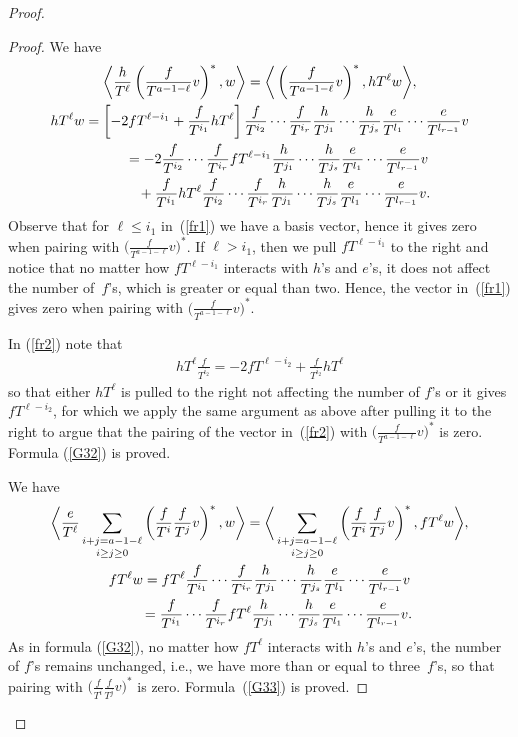 \documentclass[pdftex]{sigma}
\numberwithin{equation}{section}
\begin{document}
\begin{proof}
\begin{proof}
We have
\begin{gather}
 \bigg\langle \frac{h}{T^\ell} \left(\frac{f}{T^{a-1-\ell}}v\right)^*, w \bigg\rangle = \bigg\langle \left(\frac{f}{T^{a-1-\ell}}v\right)^*, hT^{\ell} w \bigg\rangle,\nonumber\\
hT^{\ell} w = \left[-2 fT^{\ell-i_1}+ \frac{f}{T^{i_1}} hT^{\ell} \right] \frac{f}{T^{i_2}}\cdots\frac{f}{T^{i_r}} \frac{h}{T^{j_1}}\cdots\frac{h}{T^{j_s}} \frac{e}{T^{l_1}}\cdots\frac{e}{T^{l_{r-1}}} v \nonumber \\
\hphantom{hT^{\ell} w} = -2 \frac{f}{T^{i_2}}\cdots\frac{f}{T^{i_r}} fT^{\ell-i_1} \frac{h}{T^{j_1}}\cdots\frac{h}{T^{j_s}} \frac{e}{T^{l_1}}\cdots\frac{e}{T^{l_{r-1}}} v \label{fr1} \\
\hphantom{hT^{\ell} w=} + \frac{f}{T^{i_1}} hT^{\ell} \frac{f}{T^{i_2}}\cdots\frac{f}{T^{i_r}} \frac{h}{T^{j_1}}\cdots\frac{h}{T^{j_s}} \frac{e}{T^{l_1}}\cdots\frac{e}{T^{l_{r-1}}} v. \label{fr2}
\end{gather}
Observe that for $\ell \leq i_1$ in~(\ref{fr1}) we have a basis vector, hence it gives zero when pairing with $\big(\frac{f}{T^{a-1-\ell}}v\big)^*$. If $\ell > i_1$, then we pull $fT^{\ell-i_1}$ to the right and notice that no matter how $fT^{\ell-i_1}$ interacts with $h$'s and $e$'s, it does not affect the number of~$f$'s, which is greater or equal than two. Hence, the vector in~(\ref{fr1}) gives zero when pairing with $\big(\frac{f}{T^{a-1-\ell}}v\big)^*$.

In (\ref{fr2}) note that
\begin{gather*}
hT^{\ell} \frac{f}{T^{i_2}} = -2 fT^{\ell-i_2} + \frac{f}{T^{i_2}} hT^{\ell}
\end{gather*}
so that either $hT^{\ell}$ is pulled to the right not affecting the number of $f$'s or it gives $fT^{\ell-i_2}$, for which we apply the same argument as above after pulling it to the right to argue that the pairing of the vector in~(\ref{fr2}) with $\big(\frac{f}{T^{a-1-\ell}}v\big)^*$ is zero. Formula (\ref{G32}) is proved.

We have
\begin{gather*}
\bigg\langle \frac{e}{T^{\ell}} \mathop{\sum_{i+j=a-1-\ell}}_{i\geq j\geq 0} \left(\frac{f}{T^i}\frac{f}{T^j}v\right)^*, w \bigg\rangle = \bigg\langle \mathop{\sum_{i+j=a-1-\ell}}_{i\geq j\geq 0} \left(\frac{f}{T^i}\frac{f}{T^j}v\right)^*, fT^{\ell} w \bigg\rangle, \\
fT^{\ell} w = fT^{\ell} \frac{f}{T^{i_1}}\cdots\frac{f}{T^{i_r}}
\frac{h}{T^{j_1}}\cdots\frac{h}{T^{j_s}} \frac{e}{T^{l_1}}\cdots\frac{e}{T^{l_{r-1}}} v \\
\hphantom{fT^{\ell} w} = \frac{f}{T^{i_1}}\cdots\frac{f}{T^{i_r}} fT^{\ell}
\frac{h}{T^{j_1}}\cdots\frac{h}{T^{j_s}} \frac{e}{T^{l_1}}\cdots\frac{e}{T^{l_{r-1}}} v.
\end{gather*}
As in formula (\ref{G32}), no matter how $fT^{\ell}$ interacts with $h$'s and $e$'s, the number of $f$'s remains unchanged, i.e., we have more than or equal to three~$f$'s, so that pairing with $\big(\frac{f}{T^i}\frac{f}{T^j}v\big)^*$ is zero. Formula~(\ref{G33}) is proved.
\end{proof}


\end{proof}
\end{document}
